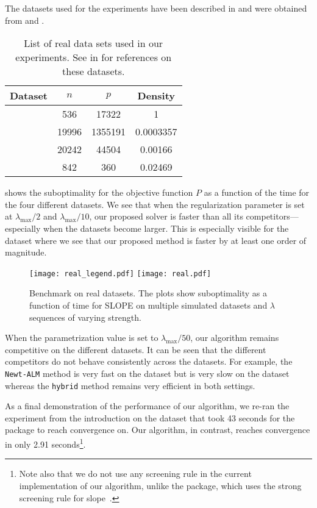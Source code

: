 The datasets used for the experiments have been described in  and were obtained from \textcite{chang2011,chang2016} and \textcite{breheny2022}.

\begin{table}[hbt]
  \centering
  \caption{%
    List of real data sets used in our experiments.
    See  in  for references on these datasets.
  }
  \label{tab:real-data}
  \begin{tabular}{
      l
      S[table-format=5.0,round-mode=off]
      S[table-format=7.0,round-mode=off]
      S[table-format=1.5,round-mode=figures,round-precision=2]
    }
    \toprule
    Dataset            & {\(n\)} & {\(p\)} & {Density} \\ \midrule
       & 536     & 17322   & 1         \\
       & 19996   & 1355191 & 0.0003357 \\
         & 20242   & 44504   & 0.00166   \\
     & 842     & 360     & 0.02469   \\ \bottomrule
  \end{tabular}
\end{table}

 shows the suboptimality for the objective function $P$ as a function of the time for the four different datasets.
We see that when the regularization parameter is set at $\lambda_{\text{max}}/2$ and $\lambda_{\text{max}}/10$, our proposed solver is faster than all its competitors---especially when the datasets become larger.
This is especially visible for the  dataset where we see that our proposed method is faster by at least one order of magnitude.

\begin{figure*}[!t]
  \centering
  \texttt{[image: real\_legend.pdf]}
  \texttt{[image: real.pdf]}
  \caption{Benchmark on real datasets. The plots show suboptimality as a function of time for SLOPE on multiple simulated datasets and $\lambda$ sequences of varying strength.}
  \label{fig:real-data}
\end{figure*}

When the parametrization value is set to $\lambda_{\text{max}}/50$, our algorithm remains competitive on the different datasets.
It can be seen that the different competitors do not behave consistently across the datasets.
For example, the \texttt{Newt-ALM} method is very fast on the  dataset but is very slow on the  dataset whereas the \texttt{hybrid} method remains very efficient in both settings.

As a final demonstration of the performance of our algorithm, we re-ran the experiment from the introduction on the  dataset that took 43 seconds for the  package to reach convergence on.
Our algorithm, in contrast, reaches convergence in only 2.91 seconds\footnote{Note also that we do not use any screening rule in the current implementation of our algorithm, unlike the  package, which uses the strong screening rule for slope~\parencite{larsson2020c}.}.
